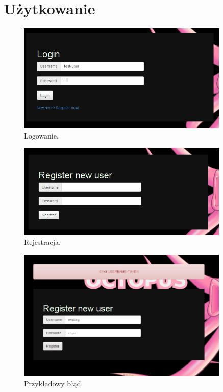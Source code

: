 \section{Użytkowanie}
\begin{figure}[ht]
    \centering
    \includegraphics[width=0.9\textwidth]{imgs/login.png}
    \caption{Logowanie.}
    \label{fig:login}
\end{figure}

\begin{figure}[ht]
    \centering
    \includegraphics[width=0.9\textwidth]{imgs/register.png}
    \caption{Rejestracja.}
    \label{fig:register}
\end{figure}

\begin{figure}[ht]
    \centering
    \includegraphics[width=0.9\textwidth]{imgs/error.png}
    \caption{Przykładowy błąd}
    \label{fig:error-example}
\end{figure}

